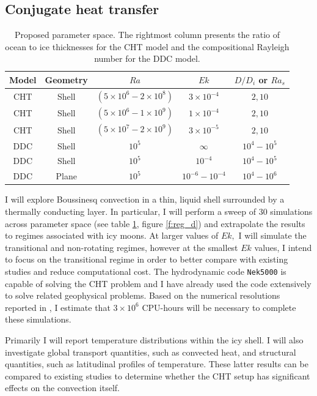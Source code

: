 \documentclass{article}
\def\lb{\left(}
\def\rb{\right)}
\begin{document}
\subsection{Conjugate heat transfer}
\begin{table}
\begin{center}
\begin{tabular}{|c|c|c|c|c|}
\hline
Model&Geometry&$Ra$&$Ek$&$D/D_{i}$ or $Ra_s$\\
\hline
CHT& Shell&$\lb 5 \times 10^{6} - 2 \times 10^{8} \rb $ & $3 \times 10^{-4} $ & $2,10$\\
\hline
CHT& Shell&$\lb 5 \times 10^{6} - 1 \times 10^{9} \rb $ & $1 \times 10^{-4} $ & $2,10$\\
\hline
CHT& Shell&$\lb 5 \times 10^{7} - 2 \times 10^{9} \rb $ & $3 \times 10^{-5} $ & $2,10$\\
\hline
DDC& Shell & $10^5$& $\infty$&$10^4-10^5$\\
\hline
DDC& Shell & $10^5$& $10^{-4}$&$10^4-10^5$\\
\hline
DDC& Plane & $10^5$& $10^{-6}-10^{-4}$&$10^{4}-10^{6}$\\
\hline
\end{tabular}
\end{center}
\caption{Proposed parameter space. The rightmost column presents the ratio of ocean to ice thicknesses for the CHT model and the compositional Rayleigh number for the DDC model. 
}
\label{t:param}
\end{table}
I will explore Boussinesq convection in a thin, liquid shell surrounded by a thermally conducting layer. 
In particular, I will perform a sweep of $30$ simulations across parameter space (see table \ref{t:param}, figure \ref{f:reg_d}) and extrapolate the results to regimes associated with icy moons.
At larger values of $Ek,$ I will simulate the transitional and non-rotating regimes, however at the smallest $Ek$ values, I intend to focus on the transitional regime in order to better compare with existing studies and reduce computational cost.
The hydrodynamic code \texttt{Nek5000}\citep{nek5000} is capable of solving the CHT problem and I have already used the code extensively to solve related geophysical problems. 
Based on the numerical resolutions reported in \citep{dL23}, I estimate that $3\times 10^{6}$ CPU-hours will be necessary to complete these simulations.

Primarily I will report temperature distributions within the icy shell. I will also investigate global transport quantities, such as convected heat, and structural quantities, such as latitudinal profiles of temperature. 
These latter results can be compared to existing studies \citep{dL23,kS19,jK22} to determine whether the CHT setup has significant effects on the convection itself.
\end{document}
